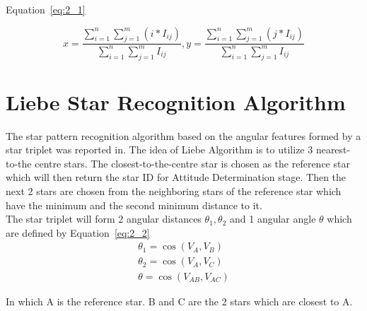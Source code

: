
\noindent Equation~\ref{eq:2_1}

\begin{equation} %
	x = \frac{\displaystyle\sum_{i=1}^{n} \displaystyle\sum_{j=1}^{m} (i * I_{ij})} {\displaystyle\sum_{i=1}^{n} \displaystyle\sum_{j=1}^{m} I_{ij}}, y = \frac{\displaystyle\sum_{i=1}^{n} \displaystyle\sum_{j=1}^{m} (j * I_{ij})} {\displaystyle\sum_{i=1}^{n} \displaystyle\sum_{j=1}^{m} I_{ij}}
	\label{eq:2_1}
\end{equation}

\section{Liebe Star Recognition Algorithm}

The star pattern recognition algorithm based on the angular features formed by a star triplet was reported in\cite{edseee.38797119950101,edseee.18038319930101,000176062300018n.d.,edseee.103539620020101,edseee.79314719990101}. The idea of Liebe Algorithm is to utilize 3 nearest-to-the centre stars. The closest-to-the-centre star is chosen as the reference star which will then return the star ID for Attitude Determination stage. Then the next 2 stars are chosen from the neighboring stars of the reference star which have the minimum and the second minimum distance to it. \\

\noindent The star triplet will form 2 angular distances $\theta_1, \theta_2$ and 1 angular angle $\theta$ which are defined by Equation~\ref{eq:2_2}
\begin{equation}
	\begin{aligned}
		\theta_1 = \cos(V_A, V_B) \\
		\theta_2 = \cos(V_A, V_C) \\
		\theta = \cos(V_{AB}, V_{AC})
	\end{aligned}
	\label{eq:2_2}
\end{equation}

\noindent In which A is the reference star. B and C are the 2 stars which are closest to A. \\


